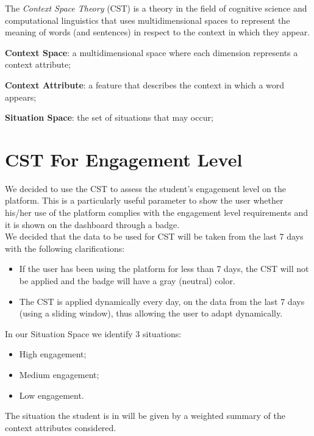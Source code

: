 The \textit{Context Space Theory} (CST) is a theory in the field of cognitive science and 
computational linguistics that uses multidimensional spaces to represent the meaning 
of words (and sentences) in respect to the context in which they appear.

\begin{itemize}{
    \item \textbf{Context Space}: a multidimensional space where each dimension represents a context attribute;
    \item \textbf{Context Attribute}: a feature that describes the context in which a word appears;
    \item \textbf{Situation Space}: the set of situations that may occur;
}
\end{itemize}


\section{CST For Engagement Level}
We decided to use the CST to assess the student's engagement level on the platform. 
This is a particularly useful parameter to show the user whether his/her use of the 
platform complies with the engagement level requirements and it is shown on the dashboard through a badge. \\
We decided that the data to be used for CST will be taken from the last 7 days with 
the following clarifications:
\begin{itemize}
    \item If the user has been using the platform for less than 7 days, the CST will 
    not be applied and the badge will have a gray (neutral) color.
    \item The CST is applied dynamically every day, on the data from the last 7 days 
    (using a sliding window), thus allowing the user to adapt dynamically.
\end{itemize}

In our Situation Space we identify 3 situations:
\begin{itemize}
    \item High engagement;
    \item Medium engagement;
    \item Low engagement.
\end{itemize}
The situation the student is in will be given by a weighted summary of the context 
attributes considered.


